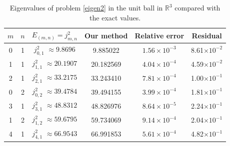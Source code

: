 \documentclass[11pt]{amsart}
\theoremstyle{definition}
\theoremstyle{remark}
\theoremstyle{plain}
\newcommand{\R}{\mathbb{R}}
\begin{document}
\begin{table}[H]
\begin{small}
\centering

\begin{tabular}{cc|c|c|c|c}
$m$ & $n$ & $E_{(m,n)} = j_{m,n}^2$ & Our method & Relative error   & Residual \\
\hline
0 & 1 & $j_{0,1}^2$   $\approx 9.8696$ & 9.885022 & $1.56\times 10^{-3}$ & 8.61$\times 10^{-2}$ \\
1 & 1 & $j_{1,1}^2$   $\approx 20.1907$ & 20.182569 & $4.04\times 10^{-4}$ & 4.59$\times 10^{-2}$\\
2 & 1 & $j_{2,1}^2$   $\approx 33.2175$ & 33.243410 & $7.81\times 10^{-4}$ & 1.00$\times 10^{-1}$\\
0 & 2 & $j_{0,2}^2$   $\approx 39.4784$ & 39.494155 & $3.99\times 10^{-4}$ & 1.81$\times 10^{-1}$ \\
3 & 1 & $j_{3,1}^2$   $\approx 48.8312$ & 48.826976 & $8.64\times 10^{-5}$ & 2.24$\times 10^{-1}$ \\
1 & 2 & $j_{1,2}^2$   $\approx 59.6795$ & 59.734069 & $9.14\times 10^{-4}$ & 2.04$\times 10^{-1}$ \\
4 & 1 & $j_{4,1}^2$   $\approx 66.9543$ & 66.991853 & $5.61\times 10^{-4}$ & 4.82$\times 10^{-1}$
\end{tabular}
\caption{Eigenvalues of problem \eqref{eigen2} in the unit ball in $\R^3$ compared with the exact values. }
\label{table.2}

\end{small} %
\end{table}



%
%
%
\end{document}
